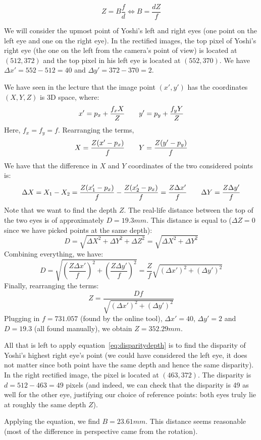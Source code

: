 \begin{equation}\label{eq:disparitydepth}
    Z=B\frac{f}{d}\Longleftrightarrow B=\frac{dZ}{f}
\end{equation}

We will consider the upmost point of Yoshi's left and right eyes (one point on the left eye and one on the right eye).
In the rectified images, the top pixel of Yoshi's right eye (the one on the left from the camera's point of view) is
located at $(512,372)$ and the top pixel in his left eye is located at $(552,370)$.
We have $\Delta x'=552-512=40$ and $\Delta y'=372-370=2$.

We have seen in the lecture that the image point $(x',y')$ has the coordinates $(X,Y,Z)$ is 3D space, where:
\[x'=p_x+\frac{f_x X}{Z}\hspace*{2em} y'=p_y+\frac{f_y Y}{Z}\]
Here, $f_x=f_y=f$.
Rearranging the terms,
\[X=\frac{Z(x'-p_x)}{f}\hspace*{2em} Y=\frac{Z(y'-p_y)}{f}\]
We have that the difference in $X$ and $Y$ coordinates of the two considered points is:
\[\Delta X=X_1-X_2=\frac{Z(x'_1-p_x)}{f}-\frac{Z(x'_2-p_x)}{f}=\frac{Z\Delta x'}{f}\hspace*{2em} \Delta Y=\frac{Z\Delta y'}{f}\]
Note that we want to find the depth $Z$.
The real-life distance between the top of the two eyes is of approximately $D=19.3mm$.
This distance is equal to ($\Delta Z=0$ since we have picked points at the same depth):
\[D=\sqrt{\Delta X^2+\Delta Y^2+\Delta Z^2}=\sqrt{\Delta X^2+\Delta Y^2}\]
Combining everything, we have:
\[D=\sqrt{\left(\frac{Z\Delta x'}{f}\right)^2+\left(\frac{Z\Delta y'}{f}\right)^2}=\frac{Z}{f}\sqrt{(\Delta x')^2+(\Delta y')^2}\]
Finally, rearranging the terms:
\[Z=\frac{Df}{\sqrt{(\Delta x')^2+(\Delta y')^2}}\]
Plugging in $f=731.057$ (found by the online tool), $\Delta x'=40$, $\Delta y'=2$ and $D=19.3$ (all found manually),
we obtain $Z=352.29mm$.

All that is left to apply equation~\eqref{eq:disparitydepth} is to find the disparity of Yoshi's highest
right eye's point (we could have considered the left eye, it does not matter since both point have the same depth and
hence the same disparity).
In the right rectified image, the pixel is located at $(463,372)$.
The disparity is $d=512-463=49$ pixels (and indeed, we can check that the disparity is 49 as well for the other eye,
justifying our choice of reference points: both eyes truly lie at roughly the same depth $Z$).

Applying the equation, we find $B=23.61mm$.
This distance seems reasonable (most of the difference in perspective came from the rotation).

